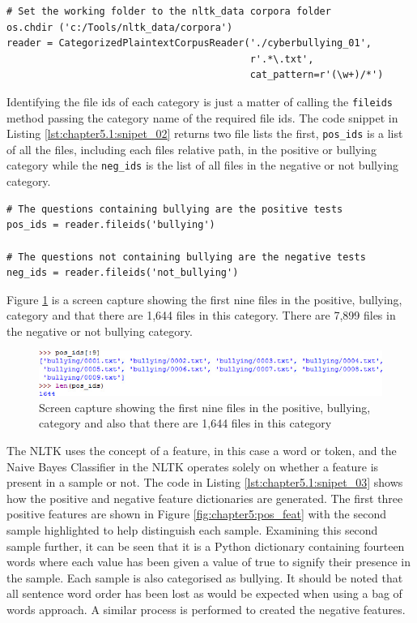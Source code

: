 \begin{lstlisting}[caption={Creating the categorised plain text corpus reader},label=lst:chapter5.1:snipet_01]
# Set the working folder to the nltk_data corpora folder
os.chdir ('c:/Tools/nltk_data/corpora')
reader = CategorizedPlaintextCorpusReader('./cyberbullying_01',
                                          r'.*\.txt',
                                          cat_pattern=r'(\w+)/*')
\end{lstlisting}

Identifying the file ids of each category is just a matter of calling the \verb|fileids| method passing the category name of the required file ids. The code snippet in Listing \ref{lst:chapter5.1:snipet_02} returns two file lists the first, \verb|pos_ids| is a list of all the files, including each files relative path, in the positive or bullying category while the \verb|neg_ids| is the list of all files in the negative or not bullying category. 

\begin{lstlisting}[caption={Identifying the positive and negative file ids},label=lst:chapter5.1:snipet_02]
# The questions containing bullying are the positive tests
pos_ids = reader.fileids('bullying')

# The questions not containing bullying are the negative tests
neg_ids = reader.fileids('not_bullying')
\end{lstlisting}

Figure \ref{fig:chapter5:pos_ids} is a screen capture showing the first nine files in the positive, bullying, category and that there are 1,644 files in this category. There are 7,899 files in the negative or not bullying category.

\begin{figure}[htbp]
	\centering
	\includegraphics[width=1\textwidth]{Figures/Chapter5/pos_ids.jpg}
	\caption[List of files for the bullying category]{Screen capture showing the first nine files in the positive, bullying, category and also that there are 1,644 files in this category}
	\label{fig:chapter5:pos_ids}
\end{figure}

The NLTK uses the concept of a feature, in this case a word or token, and the Naive Bayes Classifier in the NLTK operates solely on whether a feature is present in a sample or not. The code in Listing \ref{lst:chapter5.1:snipet_03} shows how the positive and negative feature dictionaries are generated. The first three positive features are shown in Figure \ref{fig:chapter5:pos_feat} with the second sample highlighted to help distinguish each sample. Examining this second sample further, it can be seen that it is a Python dictionary containing fourteen words where each value has been given a value of true to signify their presence in the sample. Each sample is also categorised as bullying. It should be noted that all sentence word order has been lost as would be expected when using a bag of words approach. A similar process is performed to created the negative features. 

